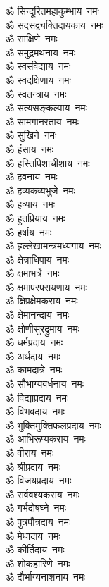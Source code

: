 \begin{multicols}{2}
\begin{flushleft}
ॐ सिन्दूरितमहाकुम्भाय~नमः\\
ॐ सदसद्व्यक्तिदायकाय~नमः\\
ॐ साक्षिणे~नमः\\
ॐ समुद्रमथनाय~नमः\\
ॐ स्वसंवेद्याय~नमः\\
ॐ स्वदक्षिणाय~नमः\\
ॐ स्वतन्त्राय~नमः\\
ॐ सत्यसङ्कल्पाय~नमः\\
ॐ सामगानरताय~नमः\\
ॐ सुखिने~नमः\hfill{}\\
ॐ हंसाय~नमः\\
ॐ हस्तिपिशाचीशाय~नमः\\
ॐ हवनाय~नमः\\
ॐ हव्यकव्यभुजे~नमः\\
ॐ हव्याय~नमः\\
ॐ हुतप्रियाय~नमः\\
ॐ हर्षाय~नमः\\
ॐ हृल्लेखामन्त्रमध्यगाय~नमः\\
ॐ क्षेत्राधिपाय~नमः\\
ॐ क्षमाभर्त्रे~नमः\hfill{}\\
ॐ क्षमापरपरायणाय~नमः\\
ॐ क्षिप्रक्षेमकराय~नमः\\
ॐ क्षेमानन्दाय~नमः\\
ॐ क्षोणीसुरद्रुमाय~नमः\\
ॐ धर्मप्रदाय~नमः\\
ॐ अर्थदाय~नमः\\
ॐ कामदात्रे~नमः\\
ॐ सौभाग्यवर्धनाय~नमः\\
ॐ विद्याप्रदाय~नमः\\
ॐ विभवदाय~नमः\hfill{}\\
ॐ भुक्तिमुक्तिफलप्रदाय~नमः\\
ॐ आभिरूप्यकराय~नमः\\
ॐ वीराय~नमः\\
ॐ श्रीप्रदाय~नमः\\
ॐ विजयप्रदाय~नमः\\
ॐ सर्ववश्यकराय~नमः\\
ॐ गर्भदोषघ्ने~नमः\\
ॐ पुत्रपौत्रदाय~नमः\\
ॐ मेधादाय~नमः\\
ॐ कीर्तिदाय~नमः\hfill{}\\
ॐ शोकहारिणे~नमः\\
ॐ दौर्भाग्यनाशनाय~नमः\\

\end{flushleft}
\end{multicols}
